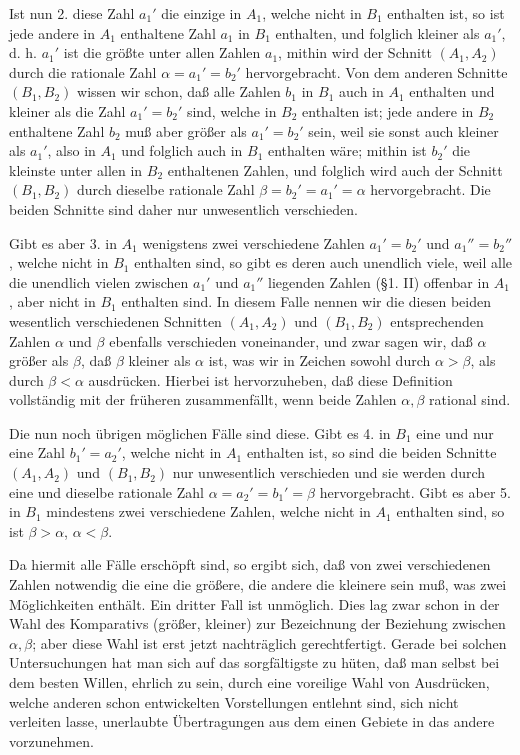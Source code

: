 \documentclass[11pt]{article}
\begin{document}
Ist nun 2. diese Zahl $a_1'$ die einzige in $A_1$, welche nicht in $B_1$ enthalten ist, so ist jede andere in $A_1$ enthaltene Zahl $a_1$ in $B_1$ enthalten, und folglich kleiner als $a_1'$, d. h. $a_1'$ ist die größte unter allen Zahlen $a_1$, mithin wird der Schnitt $(A_1,A_2)$ durch die rationale Zahl $\alpha=a_1'=b_2'$ hervorgebracht. Von dem anderen Schnitte $(B_1,B_2)$ wissen wir schon, daß alle Zahlen $b_1$ in $B_1$ auch in $A_1$ enthalten und kleiner als die Zahl $a_1'=b_2'$ sind, welche in $B_2$ enthalten ist; jede andere in $B_2$ enthaltene Zahl $b_2$ muß aber größer als $a_1'=b_2'$ sein, weil sie sonst auch kleiner als $a_1'$, also in $A_1$ und folglich auch in $B_1$ enthalten wäre; mithin ist $b_2'$ die kleinste unter allen in $B_2$ enthaltenen Zahlen, und folglich wird auch der Schnitt $(B_1,B_2)$ durch dieselbe rationale Zahl $\beta=b_2'=a_1'=\alpha$ hervorgebracht. Die beiden Schnitte sind daher nur unwesentlich verschieden.

Gibt es aber 3. in $A_1$ wenigstens zwei verschiedene Zahlen $a_1'=b_2'$ und $a_1''=b_2''$, welche nicht in $B_1$ enthalten sind, so gibt es deren auch unendlich viele, weil alle die unendlich vielen zwischen $a_1'$ und $a_1''$ liegenden Zahlen (\S 1. II) offenbar in $A_1$, aber nicht in $B_1$ enthalten sind. In diesem Falle nennen wir die diesen beiden wesentlich verschiedenen Schnitten $(A_1,A_2)$ und $(B_1,B_2)$ entsprechenden Zahlen $\alpha$ und $\beta$ ebenfalls verschieden voneinander, und zwar sagen wir, daß $\alpha$ größer als $\beta$, daß $\beta$ kleiner als $\alpha$ ist, was wir in Zeichen sowohl durch $\alpha>\beta$, als durch $\beta<\alpha$ ausdrücken. Hierbei ist hervorzuheben, daß diese Definition vollständig mit der früheren zusammenfällt, wenn beide Zahlen $\alpha,\beta$ rational sind.

Die nun noch übrigen möglichen Fälle sind diese. Gibt es 4. in $B_1$ eine und nur eine Zahl $b_1'=a_2'$, welche nicht in $A_1$ enthalten ist, so sind die beiden Schnitte $(A_1,A_2)$ und $(B_1,B_2)$ nur unwesentlich verschieden und sie werden durch eine und dieselbe rationale Zahl $\alpha=a_2'=b_1'=\beta$ hervorgebracht. Gibt es aber 5. in $B_1$ mindestens zwei verschiedene Zahlen, welche nicht in $A_1$ enthalten sind, so ist $\beta>\alpha$, $\alpha<\beta$.

Da hiermit alle Fälle erschöpft sind, so ergibt sich, daß von zwei verschiedenen Zahlen notwendig die eine die größere, die andere die kleinere sein muß, was zwei Möglichkeiten enthält. Ein dritter Fall ist unmöglich. Dies lag zwar schon in der Wahl des Komparativs (größer, kleiner) zur Bezeichnung der Beziehung zwischen $\alpha,\beta$; aber diese Wahl ist erst jetzt nachträglich gerechtfertigt. Gerade bei solchen Untersuchungen hat man sich auf das sorgfältigste zu hüten, daß man selbst bei dem besten Willen, ehrlich zu sein, durch eine voreilige Wahl von Ausdrücken, welche anderen schon entwickelten Vorstellungen entlehnt sind, sich nicht verleiten lasse, unerlaubte Übertragungen aus dem einen Gebiete in das andere vorzunehmen.
\end{document}
